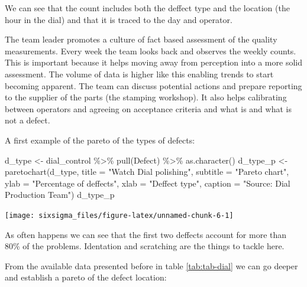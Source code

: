 \documentclass[
]{book}
\newenvironment{Shaded}{\begin{snugshade}}{\end{snugshade}}
\newcommand{\AttributeTok}[1]{\textcolor[rgb]{0.77,0.63,0.00}{#1}}
\newcommand{\FunctionTok}[1]{\textcolor[rgb]{0.00,0.00,0.00}{#1}}
\newcommand{\NormalTok}[1]{#1}
\newcommand{\OtherTok}[1]{\textcolor[rgb]{0.56,0.35,0.01}{#1}}
\newcommand{\SpecialCharTok}[1]{\textcolor[rgb]{0.00,0.00,0.00}{#1}}
\newcommand{\StringTok}[1]{\textcolor[rgb]{0.31,0.60,0.02}{#1}}
\begin{document}
We can see that the count includes both the deffect type and the location (the hour in the dial) and that it is traced to the day and operator.

The team leader promotes a culture of fact based assessment of the quality measurements. Every week the team looks back and observes the weekly counts. This is important because it helps moving away from perception into a more solid assessment. The volume of data is higher like this enabling trends to start becoming apparent. The team can discuss potential actions and prepare reporting to the supplier of the parts (the stamping workshop). It also helps calibrating between operators and agreeing on acceptance criteria and what is and what is not a defect.

A first example of the pareto of the types of defects:

\begin{Shaded}
\begin{Highlighting}[]
\NormalTok{d\_type }\OtherTok{\textless{}{-}}\NormalTok{ dial\_control }\SpecialCharTok{\%\textgreater{}\%} \FunctionTok{pull}\NormalTok{(Defect) }\SpecialCharTok{\%\textgreater{}\%} \FunctionTok{as.character}\NormalTok{()}
\NormalTok{d\_type\_p }\OtherTok{\textless{}{-}} \FunctionTok{paretochart}\NormalTok{(d\_type, }
                           \AttributeTok{title =} \StringTok{"Watch Dial polishing"}\NormalTok{,}
                           \AttributeTok{subtitle =} \StringTok{"Pareto chart"}\NormalTok{, }
                           \AttributeTok{ylab =} \StringTok{"Percentage of deffects"}\NormalTok{,}
                           \AttributeTok{xlab =} \StringTok{"Deffect type"}\NormalTok{,}
                           \AttributeTok{caption =} \StringTok{"Source: Dial Production Team"}\NormalTok{)}
\NormalTok{d\_type\_p}
\end{Highlighting}
\end{Shaded}

\texttt{[image: sixsigma\_files/figure-latex/unnamed-chunk-6-1]}

As often happens we can see that the first two deffects account for more than 80\% of the problems. Identation and scratching are the things to tackle here.

From the available data presented before in table \ref{tab:tab-dial} we can go deeper and establish a pareto of the defect location:
\end{document}
